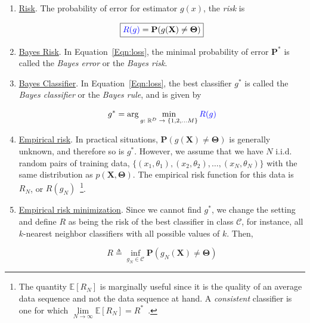 \begin{enumerate}
\item \underline{Risk}.  The probability of error for estimator $g(x)$, the {\color{blue}\emph{risk}} is

\begin{equation}
\boxed{
{\color{blue}R(g)} = \mathbf{P}(g(\mathbf{X}) \neq \mathbf{\Theta})}
\label{Eqn:loss}
\end{equation}

\item \underline{Bayes Risk}. In Equation~\ref{Eqn:loss}, the minimal probability of error $\mathbf{P}^*$ is called the \emph{Bayes error} or the \emph{Bayes risk}.  

\item \underline{Bayes Classifier}.  In Equation~\ref{Eqn:loss}, the best classifier $g^*$ is called the \emph{Bayes classifier} or the \emph{Bayes rule}, and is given by

\begin{equation}
g^* = \arg\min_{\tiny g:~\mathbb{R}^D~\rightarrow~\{1, 2, \ldots M\}} {\color{blue}R(g)}
\end{equation}

\item \underline{Empirical risk}. In practical situations, $\mathbf{P}(g(\mathbf{X}) \neq \mathbf{\Theta})$ is generally unknown, and therefore so is $g^*$.  However, we assume that we have $N$ i.i.d. random pairs of training data, $\{(x_1, \theta_1), (x_2, \theta_2), \ldots, (x_N, \theta_N)\}$ with the same distribution as $p(\mathbf{X},\mathbf{\Theta})$.  The empirical risk function for this data is $R_N$, or $R(g_N)$~\footnote{The quantity $\mathbb{E}\left[R_N\right]$ is marginally useful since it is the quality of an average data sequence and not the data sequence at hand.  A \emph{consistent} classifier is one for which $\lim\limits_{N \rightarrow \infty}\mathbb{E}\left[R_N\right] = R^*$~\cite{1996_BOOK_PR_DevroyeGyorfiLugosi}.}.
  
\item \underline{Empirical risk minimization}.
Since we cannot find $g^*$, we change the setting and define $R$ as being the risk of the best classifier in class $\mathcal{C}$, for instance, all $k$-nearest neighbor classifiers with all possible values of $k$.  Then,

\begin{equation}
R \triangleq \inf\limits_{g_N \in \mathcal{C}} \mathbf{P}(g_N(\mathbf{X}) \neq \mathbf{\Theta})
\end{equation}


\end{enumerate}
